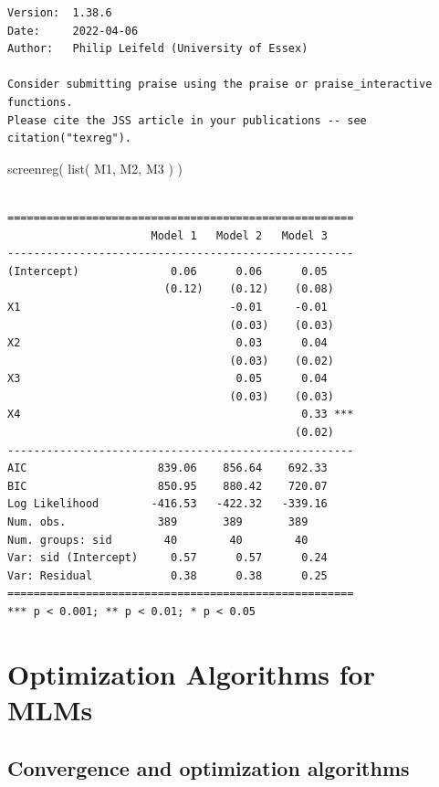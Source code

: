 \documentclass[
  letterpaper,
  DIV=11,
  numbers=noendperiod]{scrreprt}
\newenvironment{Shaded}{\begin{snugshade}}{\end{snugshade}}
\newcommand{\FunctionTok}[1]{\textcolor[rgb]{0.02,0.16,0.49}{#1}}
\newcommand{\NormalTok}[1]{\textcolor[rgb]{0.00,0.44,0.13}{#1}}
\begin{document}
\begin{verbatim}
Version:  1.38.6
Date:     2022-04-06
Author:   Philip Leifeld (University of Essex)

Consider submitting praise using the praise or praise_interactive functions.
Please cite the JSS article in your publications -- see citation("texreg").
\end{verbatim}

\begin{Shaded}
\begin{Highlighting}[]
\FunctionTok{screenreg}\NormalTok{( }\FunctionTok{list}\NormalTok{( M1, M2, M3 ) )}
\end{Highlighting}
\end{Shaded}

\begin{verbatim}

=====================================================
                      Model 1   Model 2   Model 3    
-----------------------------------------------------
(Intercept)              0.06      0.06      0.05    
                        (0.12)    (0.12)    (0.08)   
X1                                -0.01     -0.01    
                                  (0.03)    (0.03)   
X2                                 0.03      0.04    
                                  (0.03)    (0.02)   
X3                                 0.05      0.04    
                                  (0.03)    (0.03)   
X4                                           0.33 ***
                                            (0.02)   
-----------------------------------------------------
AIC                    839.06    856.64    692.33    
BIC                    850.95    880.42    720.07    
Log Likelihood        -416.53   -422.32   -339.16    
Num. obs.              389       389       389       
Num. groups: sid        40        40        40       
Var: sid (Intercept)     0.57      0.57      0.24    
Var: Residual            0.38      0.38      0.25    
=====================================================
*** p < 0.001; ** p < 0.01; * p < 0.05
\end{verbatim}

\hypertarget{optimization-algorithms-for-mlms}{%
\chapter{Optimization Algorithms for
MLMs}\label{optimization-algorithms-for-mlms}}

\hypertarget{convergence-and-optimization-algorithms}{%
\section{Convergence and optimization
algorithms}\label{convergence-and-optimization-algorithms}}
\end{document}
